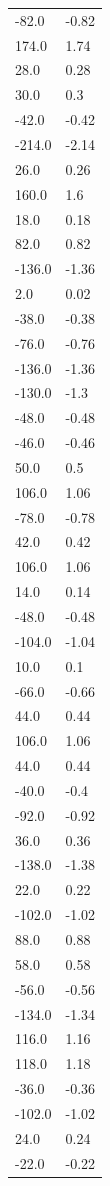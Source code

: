 \begin{longtable}{ll}
-82.0 & -0.82 \\
174.0 & 1.74 \\
28.0 & 0.28 \\
30.0 & 0.3 \\
-42.0 & -0.42 \\
-214.0 & -2.14 \\
26.0 & 0.26 \\
160.0 & 1.6 \\
18.0 & 0.18 \\
82.0 & 0.82 \\
-136.0 & -1.36 \\
2.0 & 0.02 \\
-38.0 & -0.38 \\
-76.0 & -0.76 \\
-136.0 & -1.36 \\
-130.0 & -1.3 \\
-48.0 & -0.48 \\
-46.0 & -0.46 \\
50.0 & 0.5 \\
106.0 & 1.06 \\
-78.0 & -0.78 \\
42.0 & 0.42 \\
106.0 & 1.06 \\
14.0 & 0.14 \\
-48.0 & -0.48 \\
-104.0 & -1.04 \\
10.0 & 0.1 \\
-66.0 & -0.66 \\
44.0 & 0.44 \\
106.0 & 1.06 \\
44.0 & 0.44 \\
-40.0 & -0.4 \\
-92.0 & -0.92 \\
36.0 & 0.36 \\
-138.0 & -1.38 \\
22.0 & 0.22 \\
-102.0 & -1.02 \\
88.0 & 0.88 \\
58.0 & 0.58 \\
-56.0 & -0.56 \\
-134.0 & -1.34 \\
116.0 & 1.16 \\
118.0 & 1.18 \\
-36.0 & -0.36 \\
-102.0 & -1.02 \\
24.0 & 0.24 \\
-22.0 & -0.22 \\

\end{longtable}
